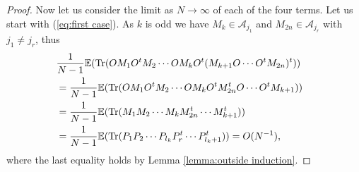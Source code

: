 \documentclass[10pt,a4paper]{amsart}
\newcommand{\Tr}{\mathrm{Tr}}
\newcommand{\cA}{\mathcal{A}}
\newcommand{\rE} {\mathbb{E}}
\begin{document}
\begin{proof}
Now let us consider the limit as $N \to \infty$ of each of
the four terms. Let us start with (\ref{eq:first case}). As
$k$ is odd we have $M_k \in \cA_{j_1}$ and $M_{2n} \in
\cA_{j_r}$ with $j_1 \not = j_r$, thus
\begin{align*} \lefteqn{
\frac{1}{N - 1}\rE( \Tr(O M_1 O^t M_2 \cdots O M_kO^t (M_{k + 1} O \cdots O^t M_{2n})^t ))} \\
& \mbox{} =
\frac{1}{N - 1}\rE( \Tr(O M_1 O^t M_2 \cdots O M_kO^t M_{2n}^t O \cdots O^t M_{k+1})) \\
& \mbox{} =
\frac{1}{N - 1}\rE( \Tr(M_1 M_2 \cdots M_k M_{2n}^t  \cdots  M_{k+1}^t)) \\
& \mbox{} =
\frac{1}{N - 1}\rE( \Tr(P_1 P_2 \cdots P_{l_k} P_{r}^t  \cdots  P_{l_k+1}^t)) = O(N^{-1}),\\
\end{align*}
where the last equality holds by Lemma \ref{lemma:outside induction}.





\end{proof}
\end{document}
